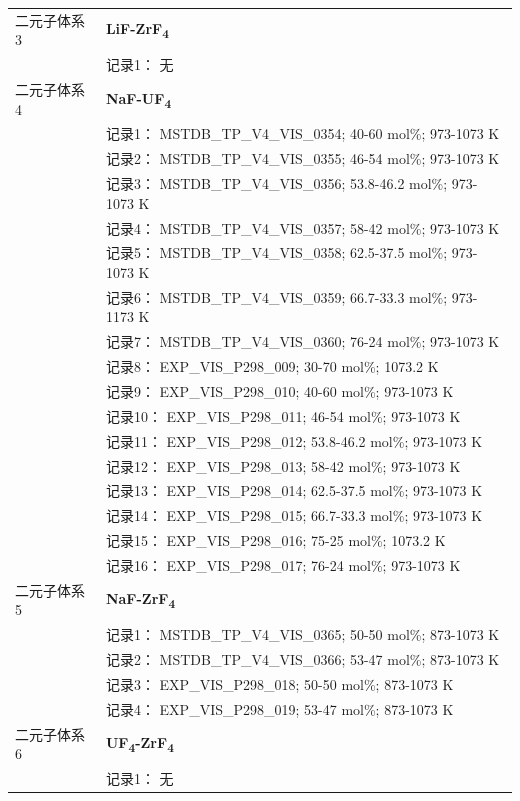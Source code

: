 \documentclass[12pt]{article}
\begin{document}
{\begin{longtable}[]{@{}
  >{\raggedright\arraybackslash}p{}
  >{\raggedright\arraybackslash}p{}@{}}
二元子体系 3 & \textbf{LiF-ZrF\textsubscript{4}} \\
 & 记录1： 无 \\
二元子体系 4  & \textbf{NaF-UF\textsubscript{4}} \\
 & 记录1： MSTDB\_TP\_V4\_VIS\_0354; 40-60 mol\%; 973-1073 K \\
 & 记录2： MSTDB\_TP\_V4\_VIS\_0355; 46-54 mol\%; 973-1073 K \\
 & 记录3： MSTDB\_TP\_V4\_VIS\_0356; 53.8-46.2 mol\%; 973-1073 K \\
 & 记录4： MSTDB\_TP\_V4\_VIS\_0357; 58-42 mol\%; 973-1073 K \\
 & 记录5： MSTDB\_TP\_V4\_VIS\_0358; 62.5-37.5 mol\%; 973-1073 K \\
 & 记录6： MSTDB\_TP\_V4\_VIS\_0359; 66.7-33.3 mol\%; 973-1173 K \\
 & 记录7： MSTDB\_TP\_V4\_VIS\_0360; 76-24 mol\%; 973-1073 K \\
 & 记录8： EXP\_VIS\_P298\_009; 30-70 mol\%; 1073.2 K \\
 & 记录9： EXP\_VIS\_P298\_010; 40-60 mol\%; 973-1073 K \\
 & 记录10： EXP\_VIS\_P298\_011; 46-54 mol\%; 973-1073 K \\
 & 记录11： EXP\_VIS\_P298\_012; 53.8-46.2 mol\%; 973-1073 K \\
 & 记录12： EXP\_VIS\_P298\_013; 58-42 mol\%; 973-1073 K \\
 & 记录13： EXP\_VIS\_P298\_014; 62.5-37.5 mol\%; 973-1073 K \\
 & 记录14： EXP\_VIS\_P298\_015; 66.7-33.3 mol\%; 973-1073 K \\
 & 记录15： EXP\_VIS\_P298\_016; 75-25 mol\%; 1073.2 K \\
 & 记录16： EXP\_VIS\_P298\_017; 76-24 mol\%; 973-1073 K  \\

二元子体系 5  & \textbf{NaF-ZrF\textsubscript{4}} \\
 & 记录1： MSTDB\_TP\_V4\_VIS\_0365; 50-50 mol\%; 873-1073 K \\
 & 记录2： MSTDB\_TP\_V4\_VIS\_0366; 53-47 mol\%; 873-1073 K \\
 & 记录3： EXP\_VIS\_P298\_018; 50-50 mol\%; 873-1073 K \\
 & 记录4： EXP\_VIS\_P298\_019; 53-47 mol\%; 873-1073 K  \\

二元子体系 6 & \textbf{UF\textsubscript{4}-ZrF\textsubscript{4}} \\
 & 记录1： 无 \\
\end{longtable}
}
\end{document}
